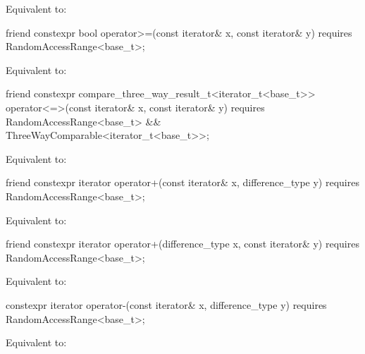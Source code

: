 \begin{itemdescr}
\pnum
\effects
Equivalent to: 
\end{itemdescr}

\begin{itemdecl}
friend constexpr bool operator>=(const iterator& x, const iterator& y)
  requires RandomAccessRange<base_t>;
\end{itemdecl}

\begin{itemdescr}
\pnum
\effects
Equivalent to: 
\end{itemdescr}

\begin{itemdecl}
friend constexpr compare_three_way_result_t<iterator_t<base_t>>
  operator<=>(const iterator& x, const iterator& y)
    requires RandomAccessRange<base_t> && ThreeWayComparable<iterator_t<base_t>>;
\end{itemdecl}

\begin{itemdescr}
\pnum
\effects
Equivalent to: 
\end{itemdescr}

\begin{itemdecl}
friend constexpr iterator operator+(const iterator& x, difference_type y)
  requires RandomAccessRange<base_t>;
\end{itemdecl}

\begin{itemdescr}
\pnum
\effects Equivalent to: 
\end{itemdescr}

\begin{itemdecl}
friend constexpr iterator operator+(difference_type x, const iterator& y)
  requires RandomAccessRange<base_t>;
\end{itemdecl}

\begin{itemdescr}
\pnum
\effects Equivalent to: 
\end{itemdescr}

\begin{itemdecl}
constexpr iterator operator-(const iterator& x, difference_type y)
  requires RandomAccessRange<base_t>;
\end{itemdecl}

\begin{itemdescr}
\pnum
\effects
Equivalent to: 
\end{itemdescr}

